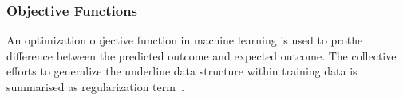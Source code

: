 \subsubsection{Objective Functions}
An optimization objective function in machine learning is used to prothe difference between the predicted outcome and expected outcome. The collective efforts to generalize the underline data structure within training data is summarised as regularization term~\cite{goodfellow_2015}.  